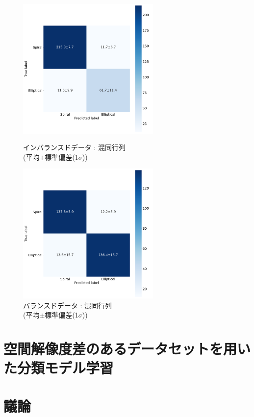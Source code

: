 \documentclass[a4j, 11pt]{jreport}
\begin{document}
\begin{figure}[H]
  \begin{minipage}[b]{0.45\hsize}
    \centering
    \includegraphics[keepaspectratio, width=7cm]{images/cm_mean_std_ex4-2.png}
    \caption{インバランスドデータ : 混同行列\\(平均$\pm$標準偏差(1$\sigma$))}
		\label{fig:cm_ex4-2-2}
  \end{minipage}
  \begin{minipage}[b]{0.45\hsize}
    \centering
    \includegraphics[keepaspectratio, width=7cm]{images/cm_mean_std_ex4-3.png}
    \caption{バランスドデータ : 混同行列\\(平均$\pm$標準偏差(1$\sigma$))}
		\label{fig:cm_ex4-3}
  \end{minipage}
\end{figure}

\newpage
\chapter{空間解像度差のあるデータセットを用いた分類モデル学習}

\newpage
\chapter{議論}
\end{document}
